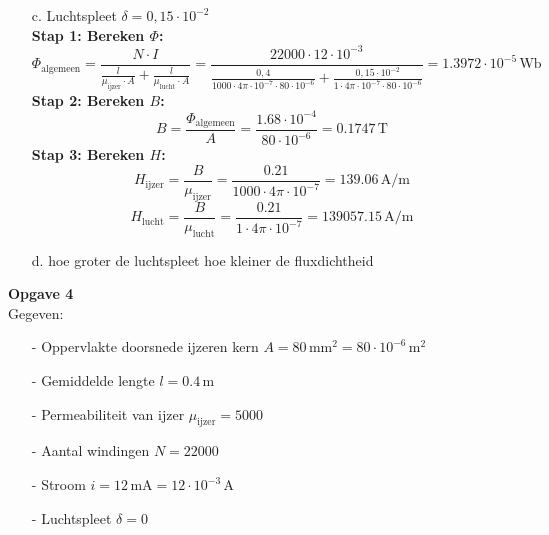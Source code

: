 \begin{enumerate}
    \item [c.]Luchtspleet \( \delta = 0,15 \cdot 10^{-2}  \)\\
        \textbf{Stap 1: Bereken \( \Phi \):} 
        \[ \Phi_{\text{algemeen}} = 
            \frac{N \cdot I}{\frac{l}{\mu_{\text{ijzer}} \cdot A} + \frac{l}{\mu_{\text{lucht}} \cdot A}}  =    \frac{22000 \cdot 12 \cdot 10^{-3}}{\frac{0,4}{1000 \cdot 4\pi \cdot 10^{-7} \cdot 80 \cdot 10^{-6}} + \frac{0,15 \cdot 10^{-2}}{1 \cdot 4\pi \cdot 10^{-7} \cdot 80 \cdot 10^{-6}}} = 1.3972 \cdot 10^{-5} \, \text{Wb} \]
        \textbf{Stap 2: Bereken \( B \):} 
        \[ B = 
            \frac{\Phi_{\text{algemeen}}}{A} = \frac{1.68 \cdot 10^{-4}}{80 \cdot 10^{-6}} = 0.1747 \, \text{T} \]
        \textbf{Stap 3: Bereken \( H \):}
        \[ H_{\text{ijzer}} = 
            \frac{B}{\mu_{\text{ijzer}}} = \frac{0.21}{1000 \cdot 4\pi \cdot 10^{-7}} = 139.06 \, \text{A/m} \]
        \[ H_{\text{lucht}} = 
            \frac{B}{\mu_{\text{lucht}}} = \frac{0.21}{1 \cdot 4\pi \cdot 10^{-7}} = 139057.15 \, \text{A/m} \]
    \item [d.] hoe groter de luchtspleet hoe kleiner de fluxdichtheid
\end{enumerate}

\newpage
\textbf{Opgave 4}\\
Gegeven:
\begin{enumerate}
    \item[-] Oppervlakte doorsnede ijzeren kern \( A = 80 \, \text{mm}^2 = 80 \cdot 10^{-6} \, \text{m}^2 \)
    \item[-] Gemiddelde lengte \( l = 0.4 \, \text{m} \)
    \item[-] Permeabiliteit van ijzer \( \mu_{\text{ijzer}} = 5000 \)
    \item[-] Aantal windingen \( N = 22000 \)
    \item[-] Stroom \( i = 12 \, \text{mA} = 12 \cdot 10^{-3} \, \text{A} \)
    \item[-] Luchtspleet \( \delta = 0 \)
\end{enumerate}

